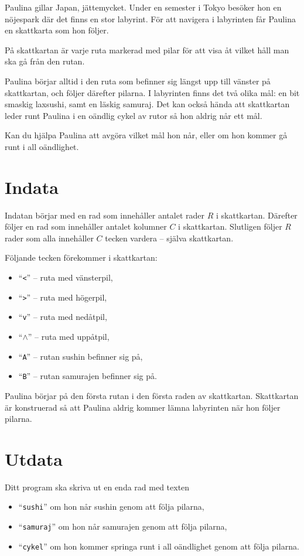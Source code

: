 Paulina gillar Japan, jättemycket.
Under en semester i Tokyo besöker hon en nöjespark där det finns en stor labyrint.
För att navigera i labyrinten får Paulina en skattkarta som hon följer.

På skattkartan är varje ruta markerad med pilar för att visa åt vilket håll man ska gå från den rutan.

Paulina börjar alltid i den ruta som befinner sig längst upp till vänster på skattkartan, och följer därefter pilarna.
I labyrinten finns det två olika mål: en bit smaskig laxsushi, samt en läskig samuraj.
Det kan också hända att skattkartan leder runt Paulina i en oändlig cykel av rutor så hon aldrig når ett mål.

Kan du hjälpa Paulina att avgöra vilket mål hon når, eller om hon kommer gå runt i all oändlighet.

\section*{Indata}
Indatan börjar med en rad som innehåller antalet rader $R$ i skattkartan.
Därefter följer en rad som innehåller antalet kolumner $C$ i skattkartan.
Slutligen följer $R$ rader som alla innehåller $C$ tecken vardera -- själva skattkartan.

Följande tecken förekommer i skattkartan:
\begin{itemize}
\item ``\texttt{<}'' -- ruta med vänsterpil,
\item ``\texttt{>}'' -- ruta med högerpil,
\item ``\texttt{v}'' -- ruta med nedåtpil,
\item ``$\wedge$'' -- ruta med uppåtpil,
\item ``\texttt{A}'' -- rutan sushin befinner sig på,
\item ``\texttt{B}'' -- rutan samurajen befinner sig på.
\end{itemize}

Paulina börjar på den första rutan i den första raden av skattkartan.
Skattkartan är konstruerad så att Paulina aldrig kommer lämna labyrinten när hon följer pilarna.

\section*{Utdata}
Ditt program ska skriva ut en enda rad med texten 
\begin{itemize}
\item ``\texttt{sushi}'' om hon når sushin genom att följa pilarna,
\item ``\texttt{samuraj}'' om hon når samurajen genom att följa pilarna,
\item ``\texttt{cykel}'' om hon kommer springa runt i all oändlighet genom att följa pilarna.
\end{itemize}

